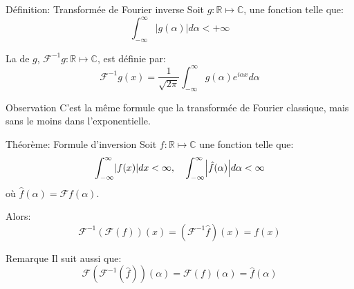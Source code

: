 \documentclass[a4paper]{article}
\begin{document}
\begin{parag}{Définition: Transformée de Fourier inverse}
    Soit $g: \mathbb{R} \mapsto \mathbb{C}$, une fonction telle que: 
    \[\int_{-\infty}^{\infty} \left|g\left(\alpha\right)\right| d\alpha < +\infty\]
    
    La  de $g$, $\mathcal{F}^{-1} g : \mathbb{R} \mapsto \mathbb{C}$, est définie par: 
    \[\mathcal{F}^{-1} g\left(x\right) = \frac{1}{\sqrt{2\pi}} \int_{-\infty}^{\infty} g\left(\alpha\right) e^{i \alpha x} d\alpha\]

    \begin{subparag}{Observation}
        C'est la même formule que la transformée de Fourier classique, mais sans le moins dans l'exponentielle.
    \end{subparag}
    
\end{parag}

\begin{parag}{Théorème: Formule d'inversion}
    Soit $f: \mathbb{R} \mapsto \mathbb{C}$ une fonction telle que: 
    \[\int_{-\infty}^{\infty} \left|f\left(x\right)\right| dx < \infty, \mathspace \int_{-\infty}^{\infty} \left|\hat{f}\left(\alpha\right)\right|d\alpha < \infty\]
    où $\hat{f}\left(\alpha\right) = \mathcal{F} f\left(\alpha\right)$.

    Alors: 
    \[\mathcal{F}^{-1} \left(\mathcal{F} \left(f\right)\right) \left(x\right) = \left(\mathcal{F}^{-1} \hat{f}\right)\left(x\right) = f\left(x\right)\]
    
    \begin{subparag}{Remarque}
        Il suit aussi que: 
        \[\mathcal{F}\left(\mathcal{F}^{-1}\left(\hat{f}\right)\right)\left(\alpha\right) = \mathcal{F}\left(f\right)\left(\alpha\right) = \hat{f}\left(\alpha\right)\]
    \end{subparag}
\end{parag}
\end{document}
